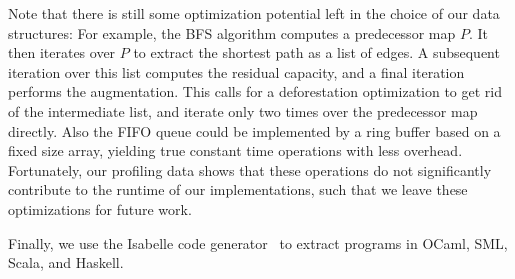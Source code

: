 \documentclass[smallcondensed]{svjour3}     %
\begin{document}
  Note that there is still some optimization potential left in the choice of our data structures: 
  For example, the BFS algorithm computes a predecessor map $P$. It then iterates over $P$ to extract the shortest path as a list of edges.
  A subsequent iteration over this list computes the residual capacity, and a final iteration performs the augmentation. 
  This calls for a deforestation optimization to get rid of the intermediate list, and iterate only two times over the predecessor map directly.
  Also the FIFO queue could be implemented by a ring buffer based on a fixed size array, yielding true constant time operations with less overhead.
  Fortunately, our profiling data shows that these operations do not significantly contribute to the runtime of our implementations, such that 
  we leave these optimizations for future work.
  
  
  Finally, we use the Isabelle code generator~\cite{Haft09,HaNi10} to extract programs in OCaml, SML, Scala, and Haskell.
  
\end{document}
